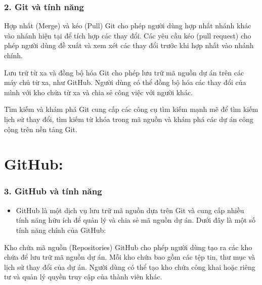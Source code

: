 \documentclass{beamer}
\begin{document}
\begin{frame}
\frametitle{ 2. Git và tính năng}

\begin{block}{ Hợp nhất (Merge) và kéo (Pull)}
Git cho phép người dùng hợp nhất nhánh khác vào nhánh hiện tại để tích hợp các thay đổi. Các yêu cầu kéo (pull request) cho phép người dùng đề xuất và xem xét các thay đổi trước khi hợp nhất vào nhánh chính.
\end{block}

\begin{block}{ Lưu trữ từ xa và đồng bộ hóa}
Git cho phép lưu trữ mã nguồn dự án trên các máy chủ từ xa, như GitHub. Người dùng có thể đồng bộ hóa các thay đổi của mình với kho chứa từ xa và chia sẻ công việc với người khác.
\end{block}

\begin{block}{ Tìm kiếm và khám phá}
Git cung cấp các công cụ tìm kiếm mạnh mẽ để tìm kiếm lịch sử thay đổi, tìm kiếm từ khóa trong mã nguồn và khám phá các dự án công cộng trên nền tảng Git.
\end{block}

\end{frame}


\section{GitHub:} 

\begin{frame}
\frametitle{ 3. GitHub và tính năng}

\begin{itemize}
\item GitHub là một dịch vụ lưu trữ mã nguồn dựa trên Git và cung cấp nhiều tính năng hữu ích để quản lý và chia sẻ mã nguồn dự án. Dưới đây là một số tính năng chính của GitHub:
\end{itemize}
\begin{block}{ Kho chứa mã nguồn (Repositories)}
GitHub cho phép người dùng tạo ra các kho chứa để lưu trữ mã nguồn dự án. Mỗi kho chứa bao gồm các tệp tin, thư mục và lịch sử thay đổi của dự án. Người dùng có thể tạo kho chứa công khai hoặc riêng tư và quản lý quyền truy cập của thành viên khác.
\end{block}

\end{frame}
\end{document}
